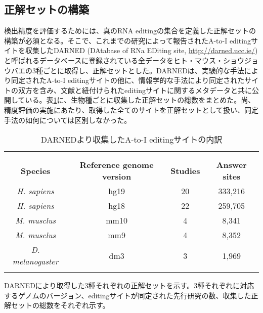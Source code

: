 \subsection{正解セットの構築}
検出精度を評価するためには、真のRNA editingの集合を定義した正解セットの構築が必須となる。そこで、これまでの研究によって報告されたA-to-I editingサイトを収集したDARNED (DAtabase of RNa EDiting site, \url{http://darned.ucc.ie/})と呼ばれるデータベースに登録されている全データをヒト・マウス・ショウジョウバエの3種ごとに取得し、正解セットとした。DARNEDは、実験的な手法により同定されたA-to-I editingサイトの他に、情報学的な手法により同定されたサイトの双方を含み、文献と紐付けられたeditingサイトに関するメタデータと共に公開している。表\ref{tab:darned}に、生物種ごとに収集した正解セットの総数をまとめた。尚、精度評価の実施にあたり、取得した全てのサイトを正解セットとして扱い、同定手法の如何については区別しなかった。
\begin{longtable}{cccc}
	\vspace{-0.5cm}
	\label{tab:darned}\\
	\caption{DARNEDより収集したA-to-I editingサイトの内訳}\\
	\cline{1-4}
	\bf{Species} & \bf{Reference genome version} & \bf{Studies} & \bf{Answer sites} \\
	\cline{1-4}
	\it{H. sapiens} & hg19 & 20  & 333,216 \\
	\it{H. sapiens} & hg18 & 22  & 259,705 \\
	\it{M. musclus} & mm10 & 4   & 8,341 \\
	\it{M. musclus} & mm9  & 4   & 8,352 \\
	\it{D. melanogaster}   & dm3 & 3 & 1,969 \\
	\cline{1-4}
	\vspace{-0.8cm}
\end{longtable}
\begin{flushleft}
	\small{DARNEDにより取得した3種それぞれの正解セットを示す。3種それぞれに対応するゲノムのバージョン、editingサイトが同定された先行研究の数、収集した正解セットの総数をそれぞれ示す。}
\end{flushleft}

